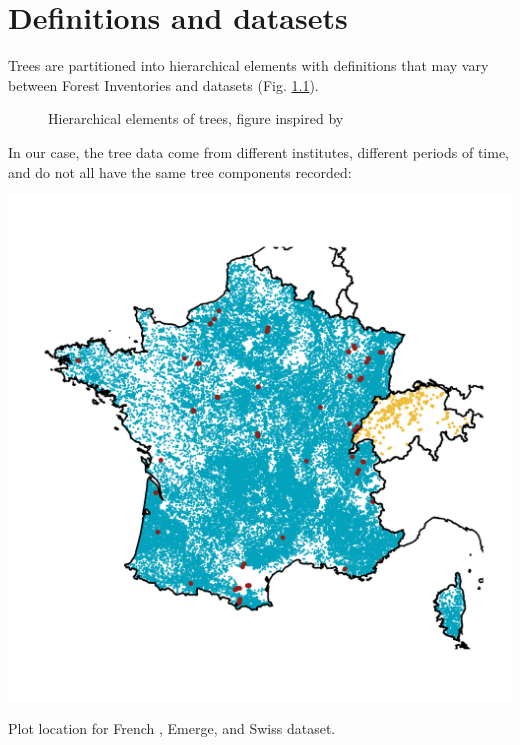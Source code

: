 \chapter{Definitions and datasets\label{chap::def}}

Trees are partitioned into hierarchical elements with definitions that may vary between Forest Inventories and datasets (\eg Fig. \ref{fig::partition}).

\begin{figure}[h]
	\centering
	
	\caption{Hierarchical elements of trees, figure inspired by \cite{Gschwantner2009} \label{fig::partition}}
\end{figure}

In our case, the tree data come from different institutes, different periods of time, and do not all have the same tree components recorded:

\begin{marginfigure}%
	\includegraphics[width=\marginparwidth]{./Figures/map.png}
	\caption{Plot location for French \NFI, Emerge, and Swiss dataset.\label{fig::map}}
\end{marginfigure}

